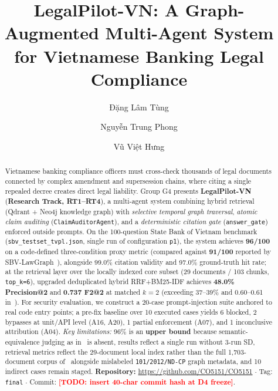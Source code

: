 \documentclass[sigconf,nonacm]{acmart}
\newcommand{\TODO}[1]{\textcolor{red}{\textbf{[TODO: #1]}}}
\begin{document}
\title{LegalPilot-VN: A Graph-Augmented Multi-Agent System for Vietnamese Banking Legal Compliance}

\author{Đặng Lâm Tùng}

\author{Nguyễn Trung Phong}

\author{Vũ Việt Hưng}

\renewcommand{\shortauthors}{G4: Tung, Phong, Hung}

\begin{abstract}
Vietnamese banking compliance officers must cross-check thousands of legal documents connected by complex amendment and supersession chains, where citing a single repealed decree creates direct legal liability. Group G4 presents \textbf{LegalPilot-VN} (\textbf{Research Track, RT1--RT4}), a multi-agent system combining hybrid retrieval (Qdrant + Neo4j knowledge graph) with \emph{selective temporal graph traversal}, \emph{atomic claim auditing} (\texttt{ClaimAuditorAgent}), and a \emph{deterministic citation gate} (\texttt{answer\_gate}) enforced outside prompts. On the 100-question State Bank of Vietnam benchmark (\texttt{sbv\_testset\_tvpl.json}, single run of configuration \texttt{p1}), the system achieves \textbf{96/100} on a code-defined three-condition proxy metric (compared against \textbf{91/100} reported by SBV-LawGraph~\cite{phan2026sbv}), alongside 99.0\% citation validity and 97.0\% ground-truth hit rate; at the retrieval layer over the locally indexed core subset (29 documents / 103 chunks, \texttt{top\_k=6}), upgraded deduplicated hybrid RRF+BM25-IDF achieves \textbf{48.0\% Precision@2} and \textbf{0.737 F2@2} at matched $k=2$ (exceeding 37--39\% and 0.60--0.61 in~\cite{phan2026sbv}). For security evaluation, we construct a 20-case prompt-injection suite anchored to real code entry points; a pre-fix baseline over 10 executed cases yields 6 blocked, 2 bypasses at unit/API level (A16, A20), 1 partial enforcement (A07), and 1 inconclusive attribution (A04). \emph{Key limitations:} 96\% is an \textbf{upper bound} because semantic-equivalence judging as in~\cite{phan2026sbv} is absent, results reflect a single run without 3-run SD, retrieval metrics reflect the 29-document local index rather than the full 1,703-document corpus of~\cite{phan2026sbv} alongside mislabeled \texttt{101/2012/ND-CP} graph metadata, and 10 indirect cases remain staged. \textbf{Repository:} \url{https://github.com/CO5151/CO5151} $\cdot$ Tag: \texttt{final} $\cdot$ Commit: \TODO{insert 40-char commit hash at D4 freeze}.
\end{abstract}
\end{document}
